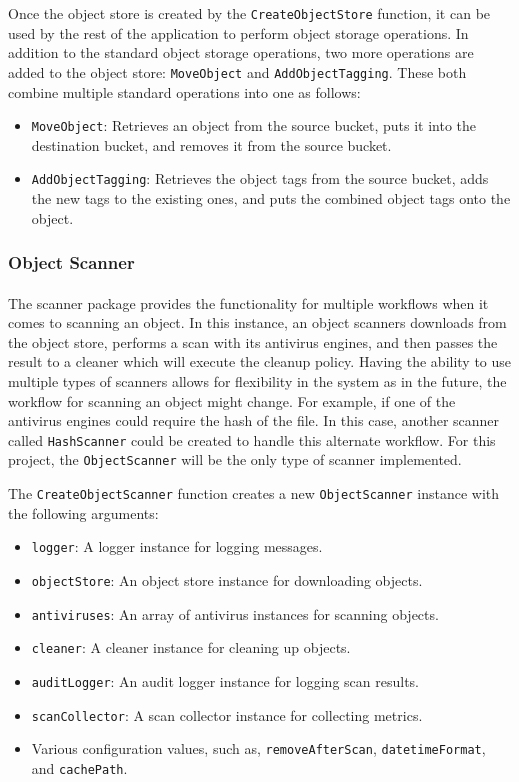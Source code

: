\documentclass[12pt, conference, final, a4paper, onecolumn, compsoc]{IEEEtran}
\begin{document}
Once the object store is created by the \texttt{CreateObjectStore} function, it
can be used by the rest of the application to perform object storage operations.
In addition to the standard object storage operations, two more operations are
added to the object store: \texttt{MoveObject} and \texttt{AddObjectTagging}.
These both combine multiple standard operations into one as follows:

\begin{itemize}
  \item \texttt{MoveObject}: Retrieves an object from the source bucket, puts it
        into the destination bucket, and removes it from the source bucket.
  \item \texttt{AddObjectTagging}: Retrieves the object tags from the source
        bucket, adds the new tags to the existing ones, and puts the combined
        object tags onto the object.
\end{itemize}

\subsubsection*{Object Scanner}
\paragraph{}
The scanner package provides the functionality for multiple workflows when it
comes to scanning an object. In this instance, an object scanners downloads from
the object store, performs a scan with its antivirus engines, and then passes
the result to a cleaner which will execute the cleanup policy. Having the
ability to use multiple types of scanners allows for flexibility in the system
as in the future, the workflow for scanning an object might change. For example,
if one of the antivirus engines could require the hash of the file. In this
case, another scanner called \texttt{HashScanner} could be created to handle
this alternate workflow. For this project, the \texttt{ObjectScanner} will be
the only type of scanner implemented.

The \texttt{CreateObjectScanner} function creates a new \texttt{ObjectScanner} instance with the following arguments:

\medskip
\begin{itemize}
  \item \texttt{logger}: A logger instance for logging messages.
  \item \texttt{objectStore}: An object store instance for downloading objects.
  \item \texttt{antiviruses}: An array of antivirus instances for scanning
        objects.
  \item \texttt{cleaner}: A cleaner instance for cleaning up objects.
  \item \texttt{auditLogger}: An audit logger instance for logging scan results.
  \item \texttt{scanCollector}: A scan collector instance for collecting
        metrics.
  \item Various configuration values, such as, \texttt{removeAfterScan},
        \texttt{datetimeFormat}, and \texttt{cachePath}.
\end{itemize}
\end{document}
